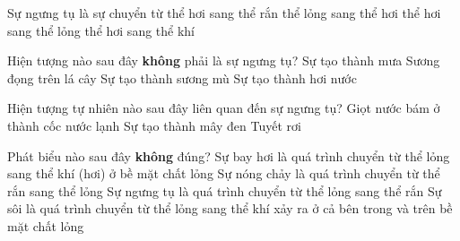 \begin{ex}
	Sự ngưng tụ là sự chuyển từ
	\choice
	{thể hơi sang thể rắn}
	{thể lỏng sang thể hơi}
	{\True thể hơi sang thể lỏng}
	{thể hơi sang thể khí}
	\end{ex}



\begin{ex}
	Hiện tượng nào sau đây \textbf{không} phải là sự ngưng tụ?
	\choice
	{Sự tạo thành mưa}
	{Sương đọng trên lá cây}
	{Sự tạo thành sương mù}
	{\True Sự tạo thành hơi nước}
	\end{ex}

\begin{ex} 
	Hiện tượng tự nhiên nào sau đây liên quan đến sự ngưng tụ?
	{\True Giọt nước bám ở thành cốc nước lạnh}
	{\True Sự tạo thành mây đen}
	{Tuyết rơi}
\end{ex}



\begin{ex}
	Phát biểu nào sau đây \textbf{không} đúng?
	\choice
	{Sự bay hơi là quá trình chuyển từ thể lỏng sang thể khí (hơi) ở bề mặt chất lỏng}
	{Sự nóng chảy là quá trình chuyển từ thể rắn sang thể lỏng}
	{\True Sự ngưng tụ là quá trình chuyển từ thể lỏng sang thể rắn}
	{Sự sôi là quá trình chuyển từ thể lỏng sang thể khí xảy ra ở cả bên trong và trên bề mặt chất lỏng}
	\end{ex}









